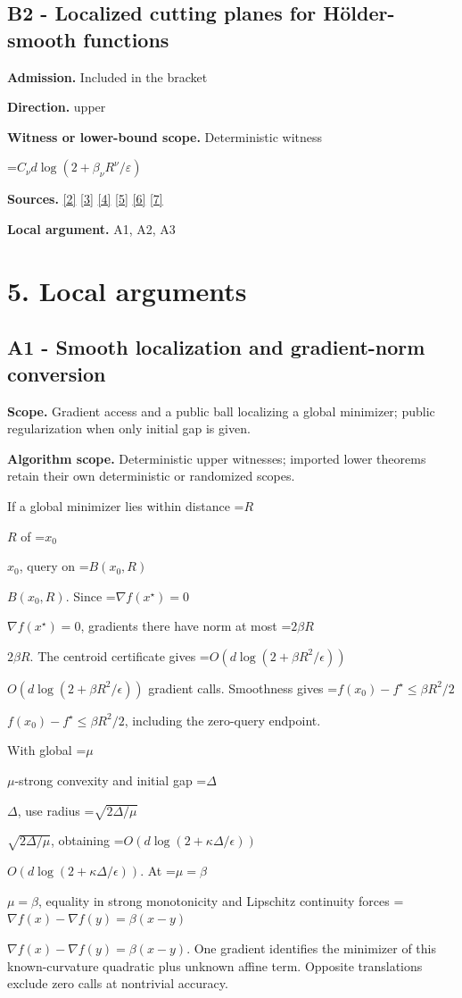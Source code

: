 \documentclass[10pt,a4paper]{article}
\newcommand{\AtlasMath}[1]{\par\begingroup\centering\setbox0=\hbox{$\displaystyle #1$}\ifdim\wd0>1.4\linewidth\typeout{ATLAS WIDE FORMULA: \the\wd0}\fi\ifdim\wd0>\linewidth\resizebox{\linewidth}{!}{\box0}\else\box0\fi\par\endgroup}
\newcommand{\AtlasInlineMath}[1]{\begingroup\setbox0=\hbox{$#1$}\ifdim\wd0>.4\linewidth\endgroup\AtlasMath{#1}\else\endgroup$#1$\fi}
\begin{document}
\subsection{B2 - Localized cutting planes for Hölder-smooth functions}
\textbf{Admission.} Included in the bracket

\textbf{Direction.} upper

\textbf{Witness or lower-bound scope.} Deterministic witness

\AtlasMath{C_\nu d\log(2+\beta_\nu R^\nu/\varepsilon)}
\textbf{Sources.} \href{https://arxiv.org/pdf/2101.09740v2}{[2]} \href{https://arxiv.org/pdf/2609.33360v2}{[3]} \href{https://arxiv.org/pdf/2609.10874}{[4]} \href{https://arxiv.org/pdf/1405.4980}{[5]} \href{https://www2.isye.gatech.edu/~nemirovs/MOR_AccuracyCertificates.pdf}{[6]} \href{https://arxiv.org/pdf/2609.20701}{[7]}

\textbf{Local argument.} A1, A2, A3

\section{5. Local arguments}
\subsection{A1 - Smooth localization and gradient-norm conversion}
\textbf{Scope.} Gradient access and a public ball localizing a global minimizer; public regularization when only initial gap is given.

\textbf{Algorithm scope.} Deterministic upper witnesses; imported lower theorems retain their own deterministic or randomized scopes.

If a global minimizer lies within distance \AtlasInlineMath{R} of \AtlasInlineMath{x_0}, query on \AtlasInlineMath{B(x_0,R)}. Since \AtlasInlineMath{\nabla f(x^\star)=0}, gradients there have norm at most \AtlasInlineMath{2\beta R}. The centroid certificate gives \AtlasInlineMath{O(d\log(2+\beta R^2/\epsilon))} gradient calls. Smoothness gives \AtlasInlineMath{f(x_0)-f^\star\le\beta R^2/2}, including the zero-query endpoint.

With global \AtlasInlineMath{\mu}-strong convexity and initial gap \AtlasInlineMath{\Delta}, use radius \AtlasInlineMath{\sqrt{2\Delta/\mu}}, obtaining \AtlasInlineMath{O(d\log(2+\kappa\Delta/\epsilon))}. At \AtlasInlineMath{\mu=\beta}, equality in strong monotonicity and Lipschitz continuity forces \AtlasInlineMath{\nabla f(x)-\nabla f(y)=\beta(x-y)}. One gradient identifies the minimizer of this known-curvature quadratic plus unknown affine term. Opposite translations exclude zero calls at nontrivial accuracy.
\end{document}
